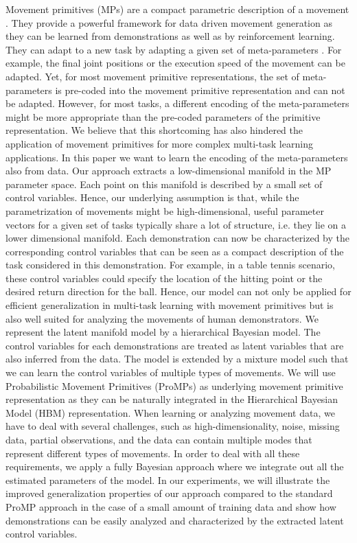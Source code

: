 \documentclass[letterpaper, 10 pt, conference]{ieeeconf}  %
\begin{document}
Movement primitives (MPs) are a compact parametric description of a movement
\cite{Paraschos2013,Ijspeert2003,Khansari-Zadeh2011,dAvella2003}. They provide a powerful framework for 
data driven movement generation as they can be learned from demonstrations as well as by reinforcement learning. They can adapt
to a new task by adapting a given set of meta-parameters
\cite{Ude2010,Kober2010, Kupcsik2013}. For example, the final joint positions or the execution speed \cite{Ijspeert2003} of the movement can be adapted. 
Yet, for most movement primitive representations, the 
set of meta-parameters is pre-coded into the movement primitive representation and can not be adapted. However, for most tasks, a different encoding of the meta-parameters
might be more appropriate than the pre-coded parameters of the primitive representation. We believe that this shortcoming has 
also hindered the application of movement primitives for more complex multi-task learning applications. In this paper we want to 
learn the encoding of the meta-parameters also from data. Our approach extracts a low-dimensional manifold in the MP parameter space. Each point 
on this manifold is described by a small set of control variables. Hence, our underlying assumption is that, while the parametrization of 
movements might be high-dimensional, useful parameter vectors for a given set of tasks typically share a lot of structure, i.e. they lie on a lower dimensional manifold.
Each demonstration can now be characterized by the corresponding 
control variables that can be seen as a compact description of the task considered in this demonstration. For example, in a table tennis scenario,
these control variables could specify the location of the hitting point or the desired return direction for the ball. 
Hence, our model can not only be applied for efficient generalization in multi-task learning with movement primitives but is also well suited 
for analyzing the movements of human demonstrators. We represent the latent manifold model by a hierarchical Bayesian model. The control
variables for each demonstrations are treated as latent variables that are also inferred from the data. The model 
is extended by a mixture model such that we can learn the control variables of multiple types of movements. We will use 
Probabilistic Movement Primitives (ProMPs)  as underlying movement primitive representation as they can be naturally integrated
in the Hierarchical Bayesian Model (HBM) representation. When learning or analyzing movement data, we have to deal
with several challenges, such as high-dimensionality, noise, missing data, partial observations, and the data can 
contain multiple modes that represent different types of movements. In order to deal with all these requirements, we 
apply a fully Bayesian approach where we integrate out all the estimated parameters of the model. In our experiments, we will
illustrate the improved generalization properties of our approach compared to the standard ProMP approach in the case of a small 
amount of training data and show how demonstrations can be easily analyzed and characterized by the extracted latent control variables. 
\end{document}

